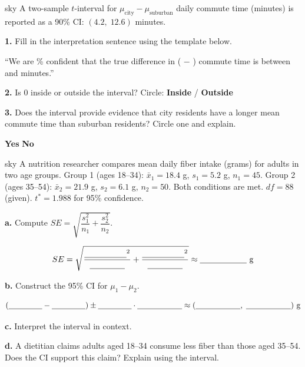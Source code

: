 \documentclass[10pt]{article}
\begin{document}
\namepartnerperiod

\vspace{0.1in}

\begin{scenariobox}{sky}
A two-sample $t$-interval for $\mu_{\text{city}} - \mu_{\text{suburban}}$ daily commute time
(minutes) is reported as a 90\% CI: $(4.2,\; 12.6)$ minutes.

\medskip
\textbf{1.} Fill in the interpretation sentence using the template below.

``We are \blank{1.5cm}\% confident that the true difference in \blank{5cm}
(\blank{2cm} $-$ \blank{2cm}) commute time is between \blank{1.5cm} and
\blank{1.5cm} minutes.''

\medskip
\textbf{2.} Is 0 inside or outside the interval? Circle:
\quad \textbf{Inside} \quad / \quad \textbf{Outside}

\medskip
\textbf{3.} Does the interval provide evidence that city residents have a longer mean commute
time than suburban residents? Circle one and explain.

\quad \textbf{Yes} \qquad \textbf{No}

\writeline
\end{scenariobox}

\begin{scenariobox}{sky}
A nutrition researcher compares mean daily fiber intake (grams) for adults in two age groups.
Group 1 (ages 18--34): $\bar x_1 = 18.4$ g, $s_1 = 5.2$ g, $n_1 = 45$.
Group 2 (ages 35--54): $\bar x_2 = 21.9$ g, $s_2 = 6.1$ g, $n_2 = 50$.
Both conditions are met. $df = 88$ (given). $t^* = 1.988$ for 95\% confidence.

\textbf{a.} Compute $SE = \sqrt{\dfrac{s_1^2}{n_1} + \dfrac{s_2^2}{n_2}}$.

\[SE = \sqrt{\dfrac{\blank{1.8cm}^2}{\blank{1.5cm}} + \dfrac{\blank{1.8cm}^2}{\blank{1.5cm}}} \approx \blank{2cm}\text{ g}\]

\textbf{b.} Construct the 95\% CI for $\mu_1 - \mu_2$.

\[(\blank{1.5cm} - \blank{1.5cm}) \pm \blank{1.5cm} \cdot \blank{2cm} \approx (\blank{2cm},\; \blank{2cm})\text{ g}\]

\textbf{c.} Interpret the interval in context. 

\textbf{d.} A dietitian claims adults aged 18--34 consume less fiber than those aged 35--54.
Does the CI support this claim? Explain using the interval.

\end{scenariobox}
\end{document}
